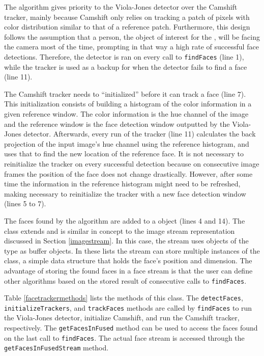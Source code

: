The algorithm gives priority to the Viola-Jones detector over the Camshift tracker, mainly because Camshift 
only relies on tracking a patch of pixels with color distribution similar to that of a reference patch. Furthermore, 
this design follows the assumption that a person, the object of interest for the \FaceTracker{}, will be facing the 
camera most of the time, prompting in that way a high rate of successful face detections. Therefore, the 
detector is ran on every call to \texttt{find\-Fac\-es} (line 1), while the tracker is used as a backup for when the 
detector fails to find a face (line 11). 

The Camshift tracker needs to ``initialized'' before it can track a face (line 7). This initialization consists of 
building a histogram of the color information in a given reference window. The color information is the hue 
channel of the image and the reference window is the face detection window outputted by the Viola-Jones 
detector. Afterwards, every run of the tracker (line 11) calculates the back projection of the input image's hue 
channel using the reference histogram, and uses that to find the new location of the reference face. It is not
necessary to reinitialize the tracker on every successful detection because on consecutive image frames 
the position of the face does not change drastically. However, after some time the information in the reference
histogram might need to be refreshed, making necessary to reinitialize the tracker with a new face detection
window (lines 5 to 7).

The faces found by the \FaceTracker{} algorithm are added to a \FaceStream{} object (lines 4 and 14). The 
\FaceStream{} class extends \Stream{} and is similar in concept to the image stream representation discussed
in Section \ref{imagestream}. In this case, the stream uses objects of the type \List{} as buffer objects. In these 
lists the stream can store multiple instances of the \Face{} class, a simple data structure that holds the face's 
position and dimension. The advantage of storing the found faces in a face stream is that the user can 
define other algorithms based on the stored result of consecutive calls to \texttt{find\-Fac\-es}.

Table \ref{facetrackermethods} lists the methods of this class. The \texttt{de\-tect\-Fac\-es}, 
\texttt{in\-i\-tial\-ize\-Track\-ers}, and \texttt{track\-Fac\-es} methods are called by \texttt{find\-Fac\-es} to 
run the Viola-Jones detector, initialize Camshift, and run the Camshift tracker, respectively. The 
\texttt{get\-Fac\-es\-In\-Fused} method can be used to access the faces found on the last call to 
\texttt{find\-Fac\-es}. The actual face stream is accessed through the \texttt{get\-Fac\-es\-In\-Fused\-Stream} 
method.

